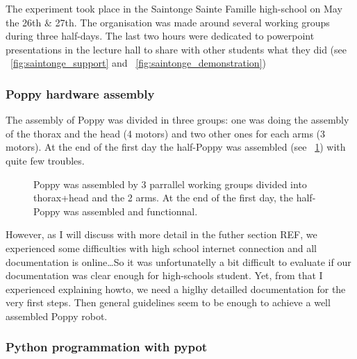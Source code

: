 The experiment took place in the Saintonge Sainte Famille high-school on May the 26th \& 27th. The organisation was made around several working groups during three half-days. The last two hours were dedicated to powerpoint presentations in the lecture hall to share with other students what they did (see \figurename~\ref{fig:saintonge_support} and \figurename~\ref{fig:saintonge_demonstration})


\subsubsection{Poppy hardware assembly} %
The assembly of Poppy was divided in three groups: one was doing the assembly of the thorax and the head (4 motors) and two other ones for each arms (3 motors). At the end of the first day the half-Poppy was assembled (see \figurename~\ref{fig:saintonge_assembly}) with quite few troubles.

\begin{figure}[h!]
\centering
    \hfil
    \hfil
    \hfil
    \caption{Poppy was assembled by 3 parrallel working groups divided into thorax+head and the 2 arms. At the end of the first day, the half-Poppy was assembled and functionnal. }
    \label{fig:saintonge_assembly}
\end{figure}

However, as I will discuss with more detail in the futher section REF, we experienced some difficulties with high school internet connection and all documentation is online\dots So it was unfortunatelly a bit difficult to evaluate if our documentation was clear enough for high-schools student. Yet, from that I experienced explaining howto, we need a higlhy detailled documentation for the very first steps. Then general guidelines seem to be enough to achieve a well assembled Poppy robot.



\subsubsection{Python programmation with pypot}

